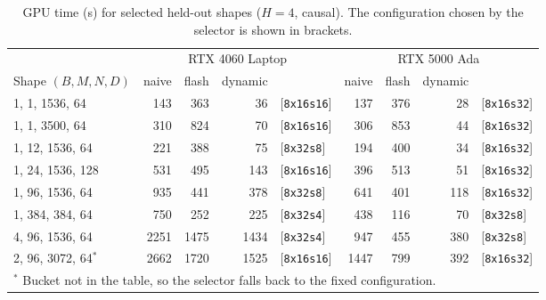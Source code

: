 \documentclass[11pt]{article}
\begin{document}
\begin{table}[H]
\centering
\caption{GPU time (\textmu s) for selected held-out shapes ($H=4$, causal).
The configuration chosen by the selector is shown in brackets.}
\label{tab:bench-shapes}
\small
\begin{tabular}{lrrrl@{\hskip 1.5em}rrrl}
\toprule
 & \multicolumn{4}{c}{RTX 4060 Laptop} & \multicolumn{4}{c}{RTX 5000 Ada} \\
Shape $(B,M,N,D)$ & naive & flash & dynamic & & naive & flash & dynamic & \\
\midrule
1, 1, 1536, 64   & 143  & 363  & 36   & [\texttt{8x16s16}] & 137  & 376  & 28  & [\texttt{8x16s32}] \\
1, 1, 3500, 64   & 310  & 824  & 70   & [\texttt{8x16s16}] & 306  & 853  & 44  & [\texttt{8x16s32}] \\
1, 12, 1536, 64  & 221  & 388  & 75   & [\texttt{8x32s8}]  & 194  & 400  & 34  & [\texttt{8x16s32}] \\
1, 24, 1536, 128 & 531  & 495  & 143  & [\texttt{8x16s16}] & 396  & 513  & 51  & [\texttt{8x16s32}] \\
1, 96, 1536, 64  & 935  & 441  & 378  & [\texttt{8x32s8}]  & 641  & 401  & 118 & [\texttt{8x16s32}] \\
1, 384, 384, 64  & 750  & 252  & 225  & [\texttt{8x32s4}]  & 438  & 116  & 70  & [\texttt{8x32s8}] \\
4, 96, 1536, 64  & 2251 & 1475 & 1434 & [\texttt{8x32s4}]  & 947  & 455  & 380 & [\texttt{8x32s8}] \\
2, 96, 3072, 64$^\ast$ & 2662 & 1720 & 1525 & [\texttt{8x16s16}] & 1447 & 799 & 392 & [\texttt{8x16s32}] \\
\bottomrule
\multicolumn{9}{l}{\footnotesize $^\ast$ Bucket not in the table, so the selector falls back to the fixed configuration.}
\end{tabular}
\end{table}
\end{document}
